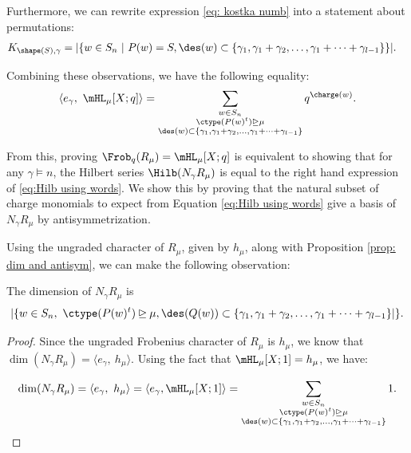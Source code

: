 Furthermore, we can rewrite expression \eqref{eq: kostka numb} into a statement about permutations:
\begin{align*}
    K_{\shape(S),\gamma} &=  | \{w \in S_n  \ | \ P(w) = S, \des(w) \subset \{\gamma_1,\gamma_1 + \gamma_2, \dots, \gamma_1 +\cdots + \gamma_{l-1}\} \} |.
\end{align*}



Combining these observations, we have the following equality:
\begin{align}\label{eq:Hilb using words}
    \langle e_{\gamma},\  \mHL_{\mu} [X;q]\rangle  = \sum\limits_{\substack{w\in S_n\\  \ctype(P(w)^t)\unrhd\mu \\ \des(w) \subset \{\gamma_1,\gamma_1 + \gamma_2, \dots, \gamma_1 +\cdots + \gamma_{l-1}\} }}  q^{\charge(w)}.
\end{align}

From this, proving $\Frob_q(R_{\mu}) = \mHL_{\mu}[X;q]$ is equivalent to showing that for any $\gamma\models n$, the Hilbert series $\Hilb(N_\gamma R_{\mu})$ is equal to the right hand expression of \eqref{eq:Hilb using words}.
We show this by proving that the natural subset of charge monomials to expect from Equation \eqref{eq:Hilb using words} give a basis of $N_\gamma R_{\mu}$ by antisymmetrization.


Using the ungraded character of $R_\mu$, given by $h_\mu$, along with Proposition \ref{prop: dim and antisym}, we can make the following observation:
\begin{lemma}\label{lem:antisymm dimension}
    The dimension of $N_\gamma R_{\mu}$ is 
    \[|\{ w \in S_n, \ \ctype(P(w)^t) \unrhd\mu, \des(Q(w)) \subset \{\gamma_1,\gamma_1 + \gamma_2, \dots, \gamma_1 + \cdots + \gamma_{l-1}\}|\}.\]
\end{lemma}
\begin{proof}
    Since the ungraded Frobenius character of $R_{\mu}$ is $h_{\mu}$, we know that $\dim(N_\gamma R_{\mu}) = \langle e_{\gamma},\ h_{\mu} \rangle$.
    Using the fact that $\mHL_{\mu}[X;1] = h_{\mu}$, we have:
    
    \[\dim(N_\gamma R_{\mu}) = \langle e_{\gamma},\ h_{\mu} \rangle =   \langle e_{\gamma},\mHL_{\mu}[X;1] \rangle = \sum\limits_{\substack{w\in S_n\\  \ctype(P(w)^t)\unrhd\mu \\ \des(w) \subset \{\gamma_1,\gamma_1 + \gamma_2, \dots, \gamma_1 +\cdots + \gamma_{l-1}\} }}  1. \qedhere\]
\end{proof}

